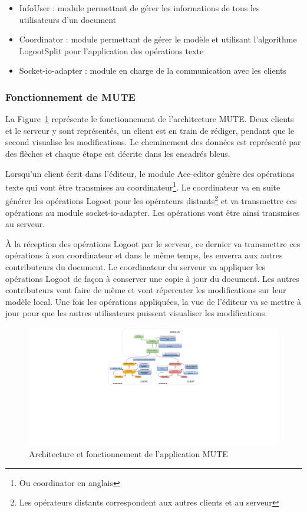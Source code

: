 \documentclass{tnreport}
\begin{document}
\begin{itemize}
  \item InfoUser : module permettant de gérer les informations de tous les utilisateurs d'un document
  \item Coordinator : module permettant de gérer le modèle et utilisant l'algorithme LogootSplit pour l'application des opérations texte
  \item Socket-io-adapter : module en charge de la communication avec les clients
\end{itemize}


\subsubsection{Fonctionnement de MUTE}

La Figure~\ref{fig:mute-archi} représente le fonctionnement de l'architecture MUTE. Deux clients et le serveur y sont représentés, un client est en train de rédiger, pendant que le second visualise les modifications. Le cheminement des données est représenté par des flèches et chaque étape est décrite dans les encadrés bleus.

Lorsqu'un client écrit dans l'éditeur, le module Ace-editor génère des opérations texte qui vont être transmises au coordinateur\footnote{Ou coordinator en anglais}. Le coordinateur va en suite générer les opérations Logoot pour les opérateurs distants\footnote{Les opérateurs distants correspondent aux autres clients et au serveur} et va transmettre ces opérations au module socket-io-adapter. Les opérations vont être ainsi transmises au serveur.

À la réception des opérations Logoot par le serveur, ce dernier va transmettre ces opérations à son coordinateur et dans le même temps, les enverra aux autres contributeurs du document. Le coordinateur du serveur va appliquer les opérations Logoot de façon à conserver une copie à jour du document. Les autres contributeurs vont faire de même et vont répercuter les modifications sur leur modèle local. Une fois les opérations appliquées, la vue de l'éditeur va se mettre à jour pour que les autres utilisateurs puissent visualiser les modifications.

\begin{figure}[!h]
  \centering
  \includegraphics[width=17cm]{figures/MUTE-archi}
  \caption{Architecture et fonctionnement de l'application MUTE}
  \label{fig:mute-archi}
\end{figure}
\end{document}
